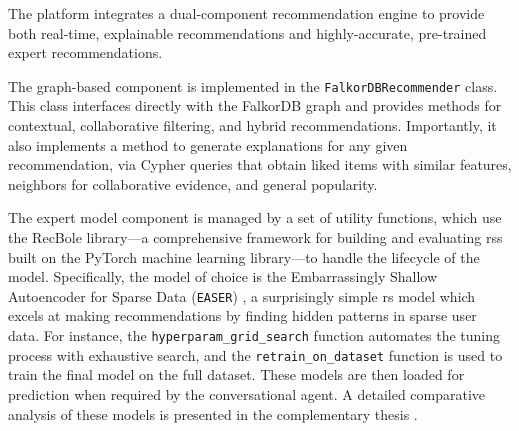 The platform integrates a dual-component recommendation engine to provide both real-time, explainable recommendations and highly-accurate, pre-trained expert recommendations.

The graph-based component is implemented in the \texttt{FalkorDBRecommender} class. This class interfaces directly with the FalkorDB graph and provides methods for contextual, collaborative filtering, and hybrid recommendations. Importantly, it also implements a method to generate explanations for any given recommendation, via Cypher queries that obtain liked items with similar features, neighbors for collaborative evidence, and general popularity.

The expert model component is managed by a set of utility functions, which use the RecBole \cite{RECBOLE} library---a comprehensive framework for building and evaluating \aclp{rs} built on the PyTorch \cite{PYTORCH} machine learning library---to handle the lifecycle of the model. Specifically, the model of choice is the Embarrassingly Shallow Autoencoder for Sparse Data (\texttt{EASER}) \cite{EASER}, a surprisingly simple \acs{rs} model which excels at making recommendations by finding hidden patterns in sparse user data. For instance, the \texttt{hyperparam\_grid\_search} function automates the tuning process with exhaustive search, and the \texttt{retrain\_on\_dataset} function is used to train the final model on the full dataset. These models are then loaded for prediction when required by the conversational agent. A detailed comparative analysis of these models is presented in the complementary thesis \cite{MUI2ICSI-THESIS}.